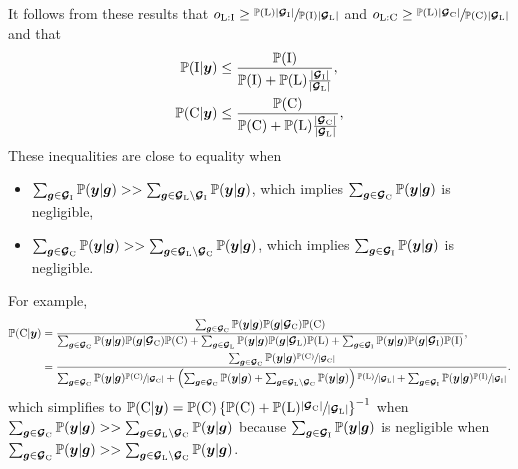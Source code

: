 \documentclass{article}
\begin{document}
It follows from these results that 
$o_{\mathrm{L}:\mathrm{I}} \ge 
\sfrac{\mathbb{P}(\mathrm{L})| \bm{\mathcal{G}}_{\mathrm{I}} |} 
{\mathbb{P}(\mathrm{I})| \bm{\mathcal{G}}_{\mathrm{L}} |}$ and 
$o_{\mathrm{L}:\mathrm{C}} \ge 
\sfrac{\mathbb{P}(\mathrm{L})| \bm{\mathcal{G}}_{\mathrm{C}} |}
{\mathbb{P}(\mathrm{C})| \bm{\mathcal{G}}_{\mathrm{L}} |}$ and that
%
\begin{align} 
\mathbb{P}(\mathrm{I} | \bm{y}) &\leq  \label{eq:reinf_prob_max}
\dfrac
{\mathbb{P}(\mathrm{I})}
{\mathbb{P}(\mathrm{I}) + 
\mathbb{P}(\mathrm{L})\frac{|\bm{\mathcal{G}}_{\mathrm{I}}|}{|\bm{\mathcal{G}}_{\mathrm{L}}|}}, \\
\mathbb{P}(\mathrm{C} | \bm{y}) &\leq \label{eq:recru_prob_max} 
\dfrac{\mathbb{P}(\mathrm{C})}
{\mathbb{P}(\mathrm{C}) + \mathbb{P}(\mathrm{L})
\frac{|\bm{\mathcal{G}}_{\mathrm{C}}|}{|\bm{\mathcal{G}}_{\mathrm{L}}|}},  
\end{align}
These inequalities are close to equality when
\begin{itemize}
\item $\sum_{\bm{g}\in\bm{\mathcal{G}}_{\mathrm{I}}}\mathbb{P}(\bm{y} | \bm{g}) >> \sum_{\bm{g}\in\bm{\mathcal{G}}_{\mathrm{L}}\setminus\bm{\mathcal{G}}_{\mathrm{I}}}\mathbb{P}(\bm{y} | \bm{g})$, which implies $\sum_{\bm{g}\in\bm{\mathcal{G}}_{\mathrm{C}}}\mathbb{P}(\bm{y} | \bm{g})$ is negligible,
\item $\sum_{\bm{g}\in\bm{\mathcal{G}}_{\mathrm{C}}}\mathbb{P}(\bm{y} | \bm{g}) >> \sum_{\bm{g}\in\bm{\mathcal{G}}_{\mathrm{L}}\setminus\bm{\mathcal{G}}_{\mathrm{C}}}\mathbb{P}(\bm{y} | \bm{g})$, which implies $\sum_{\bm{g}\in\bm{\mathcal{G}}_{\mathrm{I}}}\mathbb{P}(\bm{y} | \bm{g})$ is negligible. 
\end{itemize}
For example, 
\begin{align*}
 \mathbb{P}(\mathrm{C} | \bm{y}) 
 &= 
 \dfrac 
 {\sum_{\bm{g}\in\bm{\mathcal{G}}_{\mathrm{C}}}\mathbb{P}(\bm{y} | \bm{g})
 \mathbb{P}(\bm{g} | \bm{\mathcal{G}}_{\mathrm{C}})\mathbb{P}(\mathrm{C})}
 {\sum_{\bm{g}\in\bm{\mathcal{G}}_{\mathrm{C}}}\mathbb{P}(\bm{y} | \bm{g})
 \mathbb{P}(\bm{g} | \bm{\mathcal{G}}_{\mathrm{C}})\mathbb{P}(\mathrm{C}) + 
 \sum_{\bm{g}\in\bm{\mathcal{G}}_{\mathrm{L}}}\mathbb{P}(\bm{y} | \bm{g})
 \mathbb{P}(\bm{g} | \bm{\mathcal{G}}_{\mathrm{L}})\mathbb{P}(\mathrm{L}) + 
 \sum_{\bm{g}\in\bm{\mathcal{G}}_{\mathrm{I}}}\mathbb{P}(\bm{y} | \bm{g})
 \mathbb{P}(\bm{g} | \bm{\mathcal{G}}_{\mathrm{I}})\mathbb{P}(\mathrm{I})}, \\
 &= 
 \dfrac 
 {\sum_{\bm{g}\in\bm{\mathcal{G}}_{\mathrm{C}}}\mathbb{P}(\bm{y} | \bm{g})
 \sfrac{\mathbb{P}(\mathrm{C})}{|\bm{\mathcal{G}}_{\mathrm{C}}|}}
 {\sum_{\bm{g}\in\bm{\mathcal{G}}_{\mathrm{C}}}\mathbb{P}(\bm{y} | \bm{g})
 \sfrac{\mathbb{P}(\mathrm{C})}{|\bm{\mathcal{G}}_{\mathrm{C}}|} + 
 \left(\sum_{\bm{g}\in\bm{\mathcal{G}}_{\mathrm{C}}}\mathbb{P}(\bm{y} | \bm{g}) + 
 \sum_{\bm{g}\in\bm{\mathcal{G}}_{\mathrm{L}}\setminus\bm{\mathcal{G}}_{\mathrm{C}}}\mathbb{P}(\bm{y} | \bm{g})\right) 
 \sfrac{\mathbb{P}(\mathrm{L})}{|\bm{\mathcal{G}}_{\mathrm{L}}|} +
 \sum_{\bm{g}\in\bm{\mathcal{G}}_{\mathrm{I}}}\mathbb{P}(\bm{y} | \bm{g})
 \sfrac{\mathbb{P}(\mathrm{I})}{|\bm{\mathcal{G}}_{\mathrm{I}}|}}.
\end{align*}
which simplifies to
$ \mathbb{P}(\mathrm{C} | \bm{y}) = 
 \mathbb{P}(\mathrm{C}) \left\{
 {\mathbb{P}(\mathrm{C}) +  
 \mathbb{P}(\mathrm{L})\sfrac{|\bm{\mathcal{G}}_{\mathrm{C}}|}{|\bm{\mathcal{G}}_{\mathrm{L}}|}} \right\}^{-1}
$
when $\sum_{\bm{g}\in\bm{\mathcal{G}}_{\mathrm{C}}}\mathbb{P}(\bm{y} | \bm{g}) >>
\sum_{\bm{g}\in\bm{\mathcal{G}}_{\mathrm{L}}\setminus\bm{\mathcal{G}}_{\mathrm{C}}}\mathbb{P}(\bm{y} | \bm{g})$
because $\sum_{\bm{g}\in\bm{\mathcal{G}}_{\mathrm{I}}}\mathbb{P}(\bm{y} | \bm{g})$ 
is negligible when $\sum_{\bm{g}\in\bm{\mathcal{G}}_{\mathrm{C}}}\mathbb{P}(\bm{y} | \bm{g}) >> \sum_{\bm{g}\in\bm{\mathcal{G}}_{\mathrm{L}}\setminus\bm{\mathcal{G}}_{\mathrm{C}}}\mathbb{P}(\bm{y} | \bm{g})$. 
\end{document}
